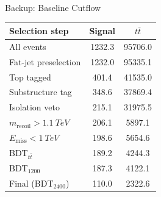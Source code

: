 \documentclass[aspectratio=169]{beamer}
\begin{document}
\begin{frame}{Backup: Baseline Cutflow}
  \small
  \centering
  \begin{tabular}{l S[table-format=5.1] S[table-format=6.1]}
    \toprule
    Selection step & {Signal} & {$t\bar{t}$} \\
    \midrule
    All events & 1232.3 & 95706.0 \\
    Fat-jet preselection & 1232.0 & 95335.1 \\
    Top tagged & 401.4 & 41535.0 \\
    Substructure tag & 348.6 & 37869.4 \\
    Isolation veto & 215.1 & 31975.5 \\
    $m_{\text{recoil}}>\SI{1.1}{TeV}$ & 206.1 & 5897.1 \\
    $E_{\text{miss}}<\SI{1}{TeV}$ & 198.6 & 5654.6 \\
    BDT$_{t\bar{t}}$ & 189.2 & 4244.3 \\
    BDT$_{1200}$ & 187.3 & 4122.1 \\
    Final (BDT$_{2400}$) & 110.0 & 2322.6 \\
    \bottomrule
  \end{tabular}
\end{frame}
\end{document}
